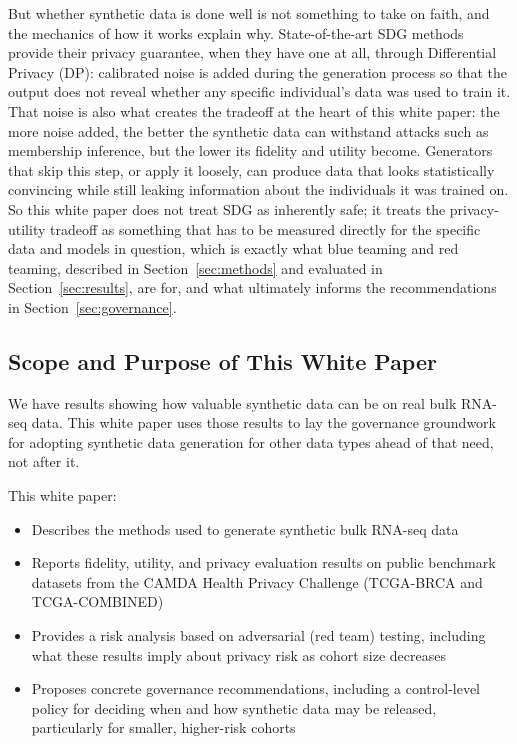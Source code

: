 \documentclass[webpdf,contemporary,large]{oup-authoring-template}%
\theoremstyle{thmstyleone}%
\theoremstyle{thmstyletwo}%
\theoremstyle{thmstylethree}%
\begin{document}
But whether synthetic data is done well is not something to take on faith, and the mechanics of how it works explain why. State-of-the-art SDG methods provide their privacy guarantee, when they have one at all, through Differential Privacy (DP): calibrated noise is added during the generation process so that the output does not reveal whether any specific individual's data was used to train it. That noise is also what creates the tradeoff at the heart of this white paper: the more noise added, the better the synthetic data can withstand attacks such as membership inference, but the lower its fidelity and utility become. Generators that skip this step, or apply it loosely, can produce data that looks statistically convincing while still leaking information about the individuals it was trained on. So this white paper does not treat SDG as inherently safe; it treats the privacy-utility tradeoff as something that has to be measured directly for the specific data and models in question, which is exactly what blue teaming and red teaming, described in Section~\ref{sec:methods} and evaluated in Section~\ref{sec:results}, are for, and what ultimately informs the recommendations in Section~\ref{sec:governance}.

\subsection{Scope and Purpose of This White Paper}
\label{sec:scope}

We have results showing how valuable synthetic data can be on real bulk RNA-seq data. This white paper uses those results  to lay the governance groundwork for adopting synthetic data generation for other data types ahead of that need, not after it.

This white paper:
\begin{itemize}
  \item Describes the methods used to generate synthetic bulk RNA-seq data
  \item Reports fidelity, utility, and privacy evaluation results on public benchmark datasets from the CAMDA Health Privacy Challenge (TCGA-BRCA and TCGA-COMBINED)
  \item Provides a risk analysis based on adversarial (red team) testing, including what these results imply about privacy risk as cohort size decreases
  \item Proposes concrete governance recommendations, including a control-level policy for deciding when and how synthetic data may be released, particularly for smaller, higher-risk cohorts
\end{itemize}
\end{document}
